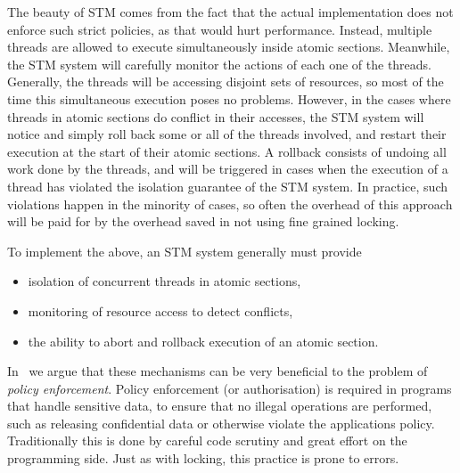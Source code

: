The beauty of STM comes from the fact that the actual implementation 
does not enforce such strict policies, 
as that would hurt performance. Instead, multiple threads are allowed to
execute simultaneously inside atomic sections. Meanwhile, the STM system will carefully
monitor the actions of each one of the threads. Generally, the threads will be
accessing disjoint sets of resources, so most of the time this simultaneous execution
poses no problems. However, in the cases where threads in atomic sections do conflict
in their accesses, the STM system will notice and simply roll back some or all
of the threads involved, and restart their execution at the start of their atomic
sections. A rollback consists of undoing all work done by the threads, and will
be triggered in cases when the execution of a thread has violated the isolation
guarantee of the STM system. In practice, such violations happen in the minority
of cases, so often the overhead of this approach will be paid for by the overhead
saved in not using fine grained locking.

To implement the above, an STM system generally must provide
\begin{itemize}
    \item isolation of concurrent threads in atomic sections,
    \item monitoring of resource access to detect conflicts,
    \item the ability to abort and rollback execution of an atomic section.
\end{itemize}
In~\cite{tmi} we argue that these mechanisms can be very beneficial to the problem
of \emph{policy enforcement}. Policy enforcement (or authorisation) is required
in programs that handle sensitive data, to ensure that no illegal operations are
performed, such as releasing confidential data or otherwise violate the applications
policy. Traditionally this is done by careful code scrutiny and great effort on
the programming side. Just as with locking, this practice is prone to errors.

